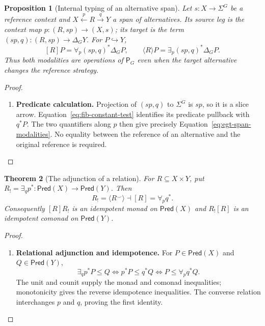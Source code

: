 \documentclass[11pt,a4paper]{article}
\numberwithin{equation}{section}
\newtheorem{theorem}{Theorem}[section]
\newtheorem{proposition}[theorem]{Proposition}
\theoremstyle{definition}
\theoremstyle{remark}
\theoremstyle{plain}
\begin{document}
\begin{proposition}[Internal typing of an alternative span]
\label{prop:fib-span-typing}
Let $s:X\to\Sigma^G$ be a reference context and
$X\xleftarrow{p}R\xrightarrow{q}Y$ a span of alternatives.
Its source leg is the context map
$p:(R,sp)\to(X,s)$; its target is the term
$(sp,q):(R,sp)\to\Delta_GY$. For $P\hookrightarrow Y$,
\[
 [R]P=\forall_p(sp,q)^*\Delta_GP,
 \qquad \langle R\rangle P=\exists_p(sp,q)^*\Delta_GP.
\]
Thus both modalities are operations of $\mathsf P_G$ even when the
target alternative changes the reference strategy.
\end{proposition}
\begin{proof}
\leavevmode
\begin{enumerate}[label=\textup{(\arabic*)},leftmargin=*,itemsep=4pt,topsep=3pt]
  \item \textbf{Predicate calculation.} Projection of $(sp,q)$ to $\Sigma^G$ is $sp$, so it is a slice
arrow. Equation~\eqref{eq:fib-constant-test} identifies its predicate
pullback with $q^*P$. The two quantifiers along $p$ then give precisely
Equation~\eqref{eq:egt-span-modalities}. No equality between the
reference of an alternative and the original reference is required.
\end{enumerate}
\end{proof}

\begin{theorem}[The adjunction of a relation]
\label{thm:egt-relation-adjunction}
For $R\subseteq X\times Y$, put
$R_!=\exists_qp^*:\mathsf{Pred}(X)\to\mathsf{Pred}(Y)$.
Then
\[
 R_!=\langle R^\smile\rangle\dashv[R]=\forall_pq^*.
\]
Consequently $[R]R_!$ is an idempotent monad on $\mathsf{Pred}(X)$
and $R_![R]$ is an idempotent comonad on $\mathsf{Pred}(Y)$.
\end{theorem}
\begin{proof}
\leavevmode
\begin{enumerate}[label=\textup{(\arabic*)},leftmargin=*,itemsep=4pt,topsep=3pt]
  \item \textbf{Relational adjunction and idempotence.} For $P\in\mathsf{Pred}(X)$ and $Q\in\mathsf{Pred}(Y)$,
\[
 \exists_qp^*P\leq Q
 \iff p^*P\leq q^*Q
 \iff P\leq\forall_pq^*Q.
\]
The unit and counit supply the monad and comonad inequalities;
monotonicity gives the reverse idempotence inequalities. The converse
relation interchanges $p$ and $q$, proving the first identity.
\end{enumerate}
\end{proof}
\end{document}
